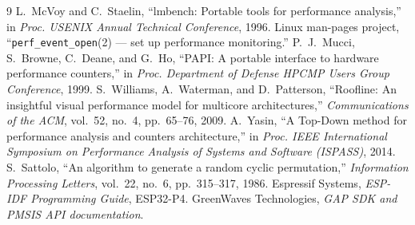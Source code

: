 \documentclass[10pt,a4paper,twocolumn]{article}
\newcommand{\code}[1]{\texttt{\small #1}}
\begin{document}
\begin{thebibliography}{9}\small
{} L.~McVoy and C.~Staelin, ``lmbench: Portable tools for performance analysis,'' in \emph{Proc. USENIX Annual Technical Conference}, 1996.
 Linux man-pages project, ``\code{perf\_event\_open}(2) --- set up performance monitoring.''
 P.~J.~Mucci, S.~Browne, C.~Deane, and G.~Ho, ``PAPI: A portable interface to hardware performance counters,'' in \emph{Proc. Department of Defense HPCMP Users Group Conference}, 1999.
 S.~Williams, A.~Waterman, and D.~Patterson, ``Roofline: An insightful visual performance model for multicore architectures,'' \emph{Communications of the ACM}, vol.~52, no.~4, pp.~65--76, 2009.
 A.~Yasin, ``A Top-Down method for performance analysis and counters architecture,'' in \emph{Proc. IEEE International Symposium on Performance Analysis of Systems and Software (ISPASS)}, 2014.
 S.~Sattolo, ``An algorithm to generate a random cyclic permutation,'' \emph{Information Processing Letters}, vol.~22, no.~6, pp.~315--317, 1986.
 Espressif Systems, \emph{ESP-IDF Programming Guide}, ESP32-P4.
 GreenWaves Technologies, \emph{GAP SDK and PMSIS API documentation}.
\end{thebibliography}
\end{document}
